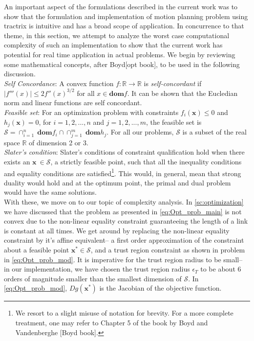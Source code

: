 \documentclass[12pt,a4]{article}
\begin{document}
An important aspect of the formulations described in the current work was to show that the formulation and implementation of motion planning problem using tractrix is intuitive and has a broad scope of application. In concurrence to that theme, in this section, we attempt to analyze the worst case computational complexity of such an implementation to show that the current work has potential for real time application in actual problems. We begin by reviewing some mathematical concepts, after Boyd[opt book], to be used in the following discussion.\\
\indent \textit{Self Concordance}: A convex function $f: \mathbb{R} \to \mathbb{R}$ is \textit{self-concordant} if $|f'''(x)|\leq 2f''(x)^{3/2}$ for all $x \in \textbf{dom}f$. It can be shown that the Eucledian norm and linear functions are self concordant.\\
\indent \textit{Feasible set}: For an optimization problem with constraints $f_i(\textbf{x})\leq 0$ and $h_j(\textbf{x})=0$, for $i=1,2,...,n$ and $j=1,2,...,m$, the feasible set is $\mathcal{S}=\cap_{i=1}^n~\textbf{dom}f_i\cap\cap_{j=1}^m~\textbf{dom}h_j$. For all our problems, $\mathcal{S} $ is a subset of the real space $\mathbb{R}$ of dimension 2 or 3.\\
\indent \textit{Slater's condition}: Slater's conditions of constraint qualification hold when there exists an $\textbf{x}~ \in \mathcal{S}$, a strictly feasible point,  such that all the inequality conditions and equality conditions are satisfied\footnote{We resort to a slight misuse of notation for brevity. For a more complete treatment, one may refer to Chapter 5 of the book by Boyd and Vandenberghe [Boyd book].}. This would, in general, mean that strong duality would hold and at the optimum point, the primal and dual problem would have the same solutions.\\
With these, we move on to our topic of complexity analysis. In \cref{sc:optimization} we have discussed that the problem as presented in \cref{eq:Opt_prob_main} is not  convex due to the non-linear equality constraint guaranteeing the length of a link is constant at all times. We get around by replacing the non-linear equality constraint by it's affine equivalent-- a first order approximation of the constraint about a feasible point $\textbf{x}^* \in \mathcal{S}$, and a trust region constraint as shown in problem in \cref{eq:Opt_prob_mod}. It is imperative for the trust region radius to be small-- in our implementation, we have chosen the trust region radius $\epsilon_T$ to be about 6 orders of magnitude smaller than the smallest dimension of $\mathcal{S}$. In \cref{eq:Opt_prob_mod}, $Dg(\textbf{x}^*)$ is the Jacobian of the objective function. 
\end{document}
